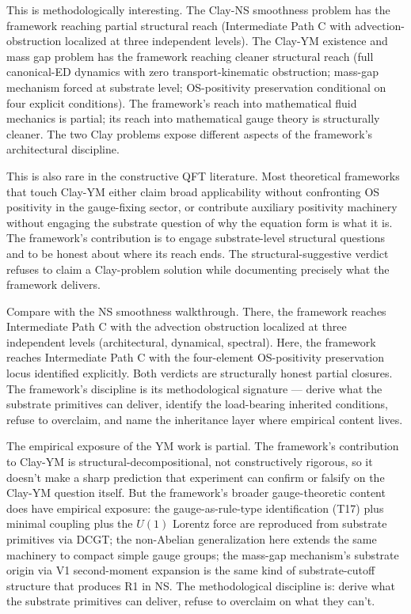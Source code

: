 \documentclass[11pt,a4paper]{article}
\begin{document}
This is methodologically interesting. The Clay-NS smoothness problem has the framework reaching partial structural reach (Intermediate Path C with advection-obstruction localized at three independent levels). The Clay-YM existence and mass gap problem has the framework reaching cleaner structural reach (full canonical-ED dynamics with zero transport-kinematic obstruction; mass-gap mechanism forced at substrate level; OS-positivity preservation conditional on four explicit conditions). The framework's reach into mathematical fluid mechanics is partial; its reach into mathematical gauge theory is structurally cleaner. The two Clay problems expose different aspects of the framework's architectural discipline.

This is also rare in the constructive QFT literature. Most theoretical frameworks that touch Clay-YM either claim broad applicability without confronting OS positivity in the gauge-fixing sector, or contribute auxiliary positivity machinery without engaging the substrate question of why the equation form is what it is. The framework's contribution is to engage substrate-level structural questions and to be honest about where its reach ends. The structural-suggestive verdict refuses to claim a Clay-problem solution while documenting precisely what the framework delivers.

Compare with the NS smoothness walkthrough. There, the framework reaches Intermediate Path C with the advection obstruction localized at three independent levels (architectural, dynamical, spectral). Here, the framework reaches Intermediate Path C with the four-element OS-positivity preservation locus identified explicitly. Both verdicts are structurally honest partial closures. The framework's discipline is its methodological signature --- derive what the substrate primitives can deliver, identify the load-bearing inherited conditions, refuse to overclaim, and name the inheritance layer where empirical content lives.

The empirical exposure of the YM work is partial. The framework's contribution to Clay-YM is structural-decompositional, not constructively rigorous, so it doesn't make a sharp prediction that experiment can confirm or falsify on the Clay-YM question itself. But the framework's broader gauge-theoretic content does have empirical exposure: the gauge-as-rule-type identification (T17) plus minimal coupling plus the $U(1)$ Lorentz force are reproduced from substrate primitives via DCGT; the non-Abelian generalization here extends the same machinery to compact simple gauge groups; the mass-gap mechanism's substrate origin via V1 second-moment expansion is the same kind of substrate-cutoff structure that produces R1 in NS. The methodological discipline is: derive what the substrate primitives can deliver, refuse to overclaim on what they can't.
\end{document}
